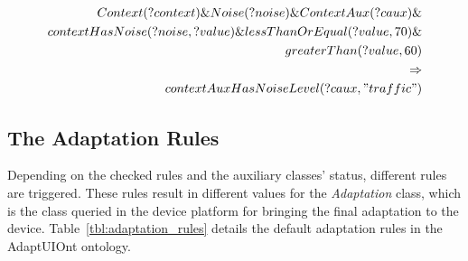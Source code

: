 \footnotesize
\begin{equation} \label{ec:pre_adaptation_rule}
  \begin{align*} 
  Context(?context) \& Noise(?noise) \& ContextAux(?caux) \& \\
  contextHasNoise(?noise, ?value) \& lessThanOrEqual(?value, 70) \& \\
  greaterThan(?value, 60) \\
  \Rightarrow \\
  contextAuxHasNoiseLevel(?caux, "traffic")
  \end{align*}
\end{equation}
\normalsize


\subsection{The Adaptation Rules}
Depending on the checked rules and the auxiliary classes’ status, different 
rules are triggered. These rules result in different values for the \textit{Adaptation} 
class, which is the class queried in the device platform for bringing the final 
adaptation to the device. Table~\ref{tbl:adaptation_rules} details the default
adaptation rules in the AdaptUIOnt ontology.

